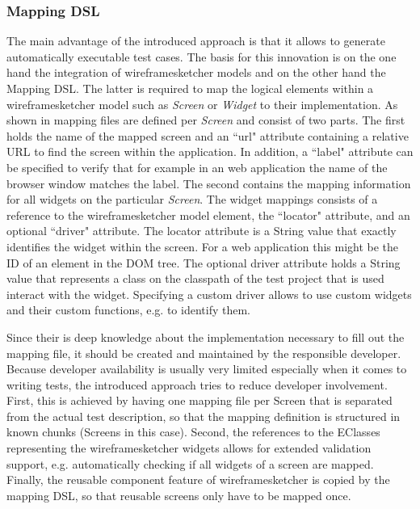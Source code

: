 \documentclass{sig-alternate-05-2015}
\begin{document}
{\subsubsection{Mapping DSL}
The main advantage of the introduced approach is that it allows to generate automatically executable test cases.
The basis for this innovation is on the one hand the integration of wireframesketcher models and on the other hand the Mapping DSL.
The latter is required to map the logical elements within a wireframesketcher model such as \textit{Screen} or \textit{Widget} to their implementation.
As shown in  mapping files are defined per \textit{Screen} and consist of two parts.
The first holds the name of the mapped screen and an ``url" attribute containing a relative URL to find the screen within the application.
In addition, a ``label" attribute can be specified to verify that for example in an web application the name of the browser window matches the label.
The second contains the mapping information for all widgets on the particular \textit{Screen}.
The widget mappings consists of a reference to the wireframesketcher model element, the ``locator" attribute, and an optional ``driver" attribute.
The locator attribute is a String value that exactly identifies the widget within the screen.
For a web application this might be the ID of an element in the DOM tree.
The optional driver attribute holds a String value that represents a class on the classpath of the test project that is used interact with the widget.
Specifying a custom driver allows to use custom widgets and their custom functions, e.g. to identify them.

Since their is deep knowledge about the implementation necessary to fill out the mapping file, it should be created and maintained by the responsible developer. 
Because developer availability is usually very limited especially when it comes to writing tests, the introduced approach tries to reduce developer involvement.
First, this is achieved by having one mapping file per Screen that is separated from the actual test description, so that the mapping definition is structured in known chunks (Screens in this case). 
Second, the references to the EClasses representing the wireframesketcher widgets allows for extended validation support, e.g. automatically checking if all widgets of a screen are mapped.
Finally, the reusable component feature of wireframesketcher is copied by the mapping DSL, so that reusable screens only have to be mapped once.

}
\end{document}
